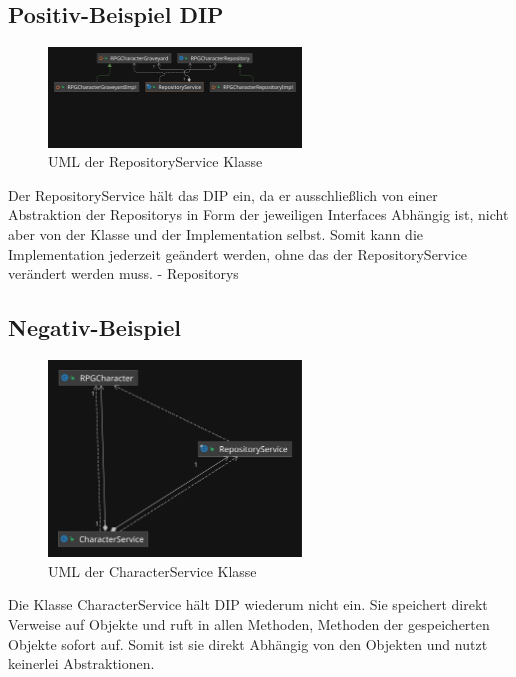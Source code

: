 \subsection{Positiv-Beispiel DIP}
\begin{figure}[H]
	\centering
	\includegraphics[width=0.6\textwidth]{Bilder/RepositoryService-DIP.pdf}
	\caption{UML der RepositoryService Klasse}
	\label{fig:repservdip}
\end{figure}
Der RepositoryService hält das DIP ein, da er ausschließlich von einer Abstraktion der Repositorys in Form der jeweiligen Interfaces Abhängig ist, nicht aber von der Klasse und der Implementation selbst. Somit kann die Implementation jederzeit geändert werden, ohne das der RepositoryService verändert werden muss. 
- Repositorys
\subsection{Negativ-Beispiel}
\begin{figure}[H]
	\centering
	\includegraphics[width=0.6\textwidth]{Bilder/CharacterService-DIP.pdf}
	\caption{UML der CharacterService Klasse}
	\label{fig:characterServDip}
\end{figure}
Die Klasse CharacterService hält DIP wiederum nicht ein. Sie speichert direkt Verweise auf Objekte und ruft in allen Methoden, Methoden der gespeicherten Objekte sofort auf. Somit ist sie direkt Abhängig von den Objekten und nutzt keinerlei Abstraktionen.